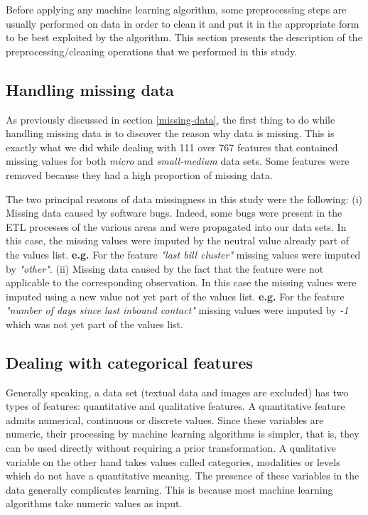 \documentclass[LaM,binding=0.6cm, english]{sapthesis}
\begin{document}
Before applying any machine learning algorithm, some preprocessing steps are usually performed on data in order to clean it and put it in the appropriate form to be best exploited by the algorithm. This section presents the description of the preprocessing/cleaning operations that we performed in this study.

\subsection{Handling missing data}

As previously discussed in section \ref{missing-data}, the first thing to do while handling missing data is to discover the reason why data is missing. This is exactly what we did while dealing with 111 over 767 features that contained missing values for both \textit{micro} and \textit{small-medium} data sets. Some features were removed because they had a high proportion of missing data.

The two principal reasons of data missingness in this study were the following: (i) Missing data caused by software bugs. Indeed, some bugs were present in the ETL processes of the various areas and were propagated into our data sets. In this case, the missing values were imputed by the neutral value already part of the values list. \textbf{e.g.} For the feature \textit{"last bill cluster"} missing values were imputed by \textit{"other"}. (ii) Missing data caused by the fact that the feature were not applicable to the corresponding observation. In this case the missing values were imputed using a new value not yet part of the values list. \textbf{e.g.} For the feature \textit{"number of days since last inbound contact"} missing values were imputed by \textit{-1} which was not yet part of the values list.

\subsection{Dealing with categorical features}

Generally speaking, a data set (textual data and images are excluded) has two types of features: quantitative and qualitative features. A quantitative feature admits numerical, continuous or discrete values. Since these variables are numeric, their processing by machine learning algorithms is simpler, that is, they can be used directly without requiring a prior transformation. A qualitative variable on the other hand takes values called categories, modalities or levels which do not have a quantitative meaning. The presence of these variables in the data generally complicates learning. This is because most machine learning algorithms take numeric values as input.
\end{document}
